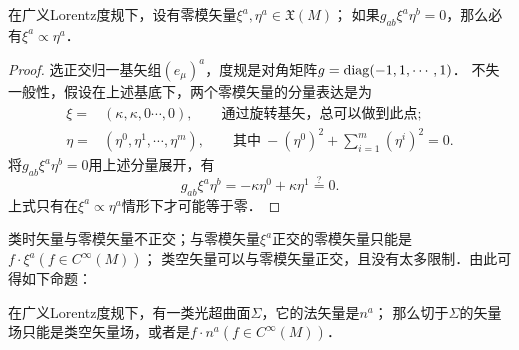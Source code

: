 \begin{proposition}\label{chnull:thm_null-self}
    在广义Lorentz度规下，设有零模矢量$\xi^a, \eta^a \in \mathfrak{X}(M)$；
    如果$g_{ab}\xi^a \eta^b=0$，那么必有$\xi^a\propto \eta^a$．
\end{proposition}
\begin{proof}
    选正交归一基矢组$(e_\mu)^a$，度规是对角矩阵$g={\rm diag}(-1,1,\cdots,1)$．
    不失一般性，假设在上述基底下，两个零模矢量的分量表达是为
    \begin{align}
        \xi=&(\kappa,\kappa,0 \cdots, 0),\qquad \text{通过旋转基矢，总可以做到此点}; \\
        \eta=&(\eta^0,\eta^1, \cdots, \eta^m),\qquad\text{其中}\  -(\eta^0)^2 + \sum_{i=1}^{m}(\eta^i)^2 =0.
    \end{align}
    将$g_{ab}\xi^a \eta^b=0$用上述分量展开，有 %
    \begin{equation}
        g_{ab}\xi^a \eta^b= -\kappa \eta^0 + \kappa \eta^1 \overset{?}{=} 0.
    \end{equation}
    上式只有在$\xi^a\propto \eta^a$情形下才可能等于零．
\end{proof}
类时矢量与零模矢量不正交；与零模矢量$\xi^a$正交的零模矢量只能是$f\cdot \xi^a(f \in C^\infty(M))$；
类空矢量可以与零模矢量正交，且没有太多限制．由此可得如下命题：

\begin{proposition}\label{chnull:thm_null-sxi}
    在广义Lorentz度规下，有一类光超曲面$\Sigma$，它的法矢量是$n^a$；
    那么切于$\Sigma$的矢量场只能是类空矢量场，或者是$f\cdot n^a(f \in C^\infty(M))$．
\end{proposition}



